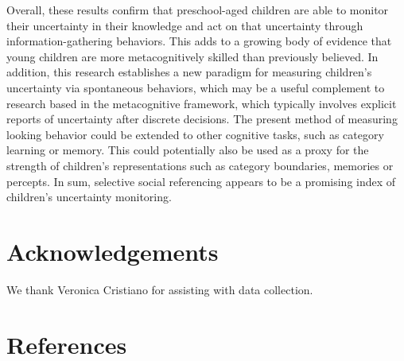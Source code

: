 \documentclass[10pt, letterpaper]{article}
\begin{document}
Overall, these results confirm that preschool-aged children are able to
monitor their uncertainty in their knowledge and act on that uncertainty
through information-gathering behaviors. This adds to a growing body of
evidence that young children are more metacognitively skilled than
previously believed. In addition, this research establishes a new
paradigm for measuring children's uncertainty via spontaneous behaviors,
which may be a useful complement to research based in the metacognitive
framework, which typically involves explicit reports of uncertainty
after discrete decisions. The present method of measuring looking
behavior could be extended to other cognitive tasks, such as category
learning or memory. This could potentially also be used as a proxy for
the strength of children's representations such as category boundaries,
memories or percepts. In sum, selective social referencing appears to be
a promising index of children's uncertainty monitoring.

\section{Acknowledgements}\label{acknowledgements}

We thank Veronica Cristiano for assisting with data collection.

\section{References}\label{references}

\setlength{\parindent}{-0.1in} \setlength{\leftskip}{0.125in} \noindent
\end{document}
